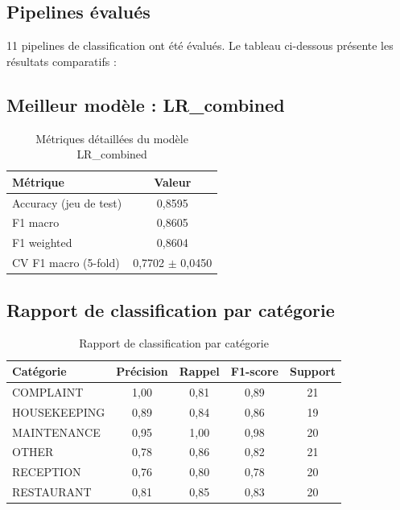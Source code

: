 

\subsection*{Pipelines évalués}

11 pipelines de classification ont été évalués. Le tableau ci-dessous présente les résultats comparatifs :


\subsection*{Meilleur modèle : LR\_combined}

\begin{table}[H]
\centering
\caption{Métriques détaillées du modèle LR\_combined}
\label{tab:metriques_lr_combined}
\begin{tabular}{|l|c|}
\hline
\textbf{Métrique} & \textbf{Valeur} \\
\hline
Accuracy (jeu de test) & 0,8595 \\
\hline
F1 macro & 0,8605 \\
\hline
F1 weighted & 0,8604 \\
\hline
CV F1 macro (5-fold) & 0,7702 $\pm$ 0,0450 \\
\hline
\end{tabular}
\end{table}

\subsection*{Rapport de classification par catégorie}

\begin{table}[H]
\centering
\caption{Rapport de classification par catégorie}
\label{tab:classification_par_categorie}
\begin{tabular}{|l|c|c|c|c|}
\hline
\textbf{Catégorie} & \textbf{Précision} & \textbf{Rappel} & \textbf{F1-score} & \textbf{Support} \\
\hline
COMPLAINT & 1,00 & 0,81 & 0,89 & 21 \\
\hline
HOUSEKEEPING & 0,89 & 0,84 & 0,86 & 19 \\
\hline
MAINTENANCE & 0,95 & 1,00 & 0,98 & 20 \\
\hline
OTHER & 0,78 & 0,86 & 0,82 & 21 \\
\hline
RECEPTION & 0,76 & 0,80 & 0,78 & 20 \\
\hline
RESTAURANT & 0,81 & 0,85 & 0,83 & 20 \\
\hline
\end{tabular}
\end{table}

